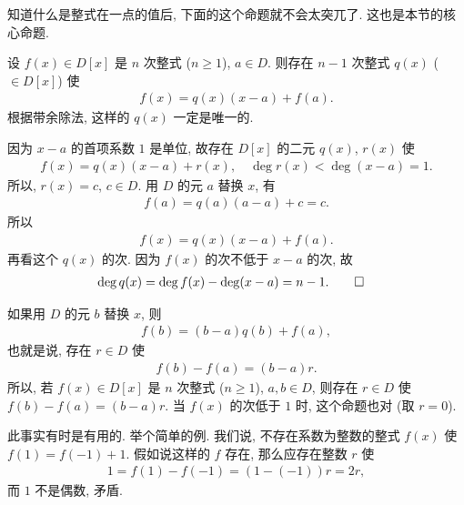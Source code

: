知道什么是整式在一点的值后, 下面的这个命题就不会太突兀了. 这也是本节的核心命题.

\begin{proposition}
    设 $f(x) \in D[x]$ 是 $n$ 次整式 ($n \geq 1$), $a \in D$. 则存在 $n-1$ 次整式 $q(x)$ ($\in D[x]$) 使
    \begin{align*}
        f(x) = q(x) (x-a) + f(a).
    \end{align*}
    根据带余除法, 这样的 $q(x)$ 一定是唯一的.
\end{proposition}

\begin{pf}
    因为 $x-a$ 的首项系数 $1$ 是单位, 故存在 $D[x]$ 的二元 $q(x)$, $r(x)$ 使
    \begin{align*}
        f(x) = q(x) (x-a) + r(x), \quad \deg r(x) < \deg (x-a) = 1.
    \end{align*}
    所以, $r(x) = c$, $c \in D$. 用 $D$ 的元 $a$ 替换 $x$, 有
    \begin{align*}
        f(a) = q(a) (a-a) + c = c.
    \end{align*}
    所以
    \begin{align*}
        f(x) = q(x) (x-a) + f(a).
    \end{align*}
    再看这个 $q(x)$ 的次. 因为 $f(x)$ 的次不低于 $x-a$ 的次, 故
    \begin{align*}
         & \deg q(x) = \deg f(x) - \deg (x-a) = n-1. \qedhere
    \end{align*}
\end{pf}

\begin{remark}
    如果用 $D$ 的元 $b$ 替换 $x$, 则
    \begin{align*}
        f(b) = (b-a)q(b) + f(a),
    \end{align*}
    也就是说, 存在 $r \in D$ 使
    \begin{align*}
        f(b) - f(a) = (b-a)r.
    \end{align*}
    所以, 若 $f(x) \in D[x]$ 是 $n$ 次整式 ($n \geq 1$), $a,b \in D$, 则存在 $r \in D$ 使 $f(b) - f(a) = (b-a)r$. 当 $f(x)$ 的次低于 $1$ 时, 这个命题也对 (取 $r=0$).

    此事实有时是有用的. 举个简单的例. 我们说, 不存在系数为整数的整式 $f(x)$ 使 $f(1) = f(-1) + 1$. 假如说这样的 $f$ 存在, 那么应存在整数 $r$ 使
    \begin{align*}
        1 = f(1) - f(-1) = (1 - (-1))r = 2r,
    \end{align*}
    而 $1$ 不是偶数, 矛盾.
\end{remark}
